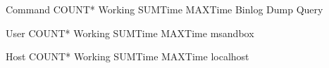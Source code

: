 \documentclass[letterpaper,10pt,english]{sphinxmanual}
\begin{document}
\begin{sphinxVerbatim}[commandchars=\\\{\}]

  Command                        COUNT* Working SUMTime MAXTime
  \PYGZhy{}\PYGZhy{}\PYGZhy{}\PYGZhy{}\PYGZhy{}\PYGZhy{}\PYGZhy{}\PYGZhy{}\PYGZhy{}\PYGZhy{}\PYGZhy{}\PYGZhy{}\PYGZhy{}\PYGZhy{}\PYGZhy{}\PYGZhy{}\PYGZhy{}\PYGZhy{}\PYGZhy{}\PYGZhy{}\PYGZhy{}\PYGZhy{}\PYGZhy{}\PYGZhy{}\PYGZhy{}\PYGZhy{}\PYGZhy{}\PYGZhy{}\PYGZhy{}\PYGZhy{} \PYGZhy{}\PYGZhy{}\PYGZhy{}\PYGZhy{}\PYGZhy{}\PYGZhy{}\PYGZhy{}\PYGZhy{} \PYGZhy{}\PYGZhy{}\PYGZhy{}\PYGZhy{}\PYGZhy{}\PYGZhy{}\PYGZhy{} \PYGZhy{}\PYGZhy{}\PYGZhy{}\PYGZhy{}\PYGZhy{}\PYGZhy{}\PYGZhy{}\PYGZhy{}\PYGZhy{} \PYGZhy{}\PYGZhy{}\PYGZhy{}\PYGZhy{}\PYGZhy{}\PYGZhy{}\PYGZhy{}\PYGZhy{}\PYGZhy{}
  Binlog Dump                                          
  Query                                                          

  User                           COUNT* Working SUMTime MAXTime
  \PYGZhy{}\PYGZhy{}\PYGZhy{}\PYGZhy{}\PYGZhy{}\PYGZhy{}\PYGZhy{}\PYGZhy{}\PYGZhy{}\PYGZhy{}\PYGZhy{}\PYGZhy{}\PYGZhy{}\PYGZhy{}\PYGZhy{}\PYGZhy{}\PYGZhy{}\PYGZhy{}\PYGZhy{}\PYGZhy{}\PYGZhy{}\PYGZhy{}\PYGZhy{}\PYGZhy{}\PYGZhy{}\PYGZhy{}\PYGZhy{}\PYGZhy{}\PYGZhy{}\PYGZhy{} \PYGZhy{}\PYGZhy{}\PYGZhy{}\PYGZhy{}\PYGZhy{}\PYGZhy{}\PYGZhy{}\PYGZhy{} \PYGZhy{}\PYGZhy{}\PYGZhy{}\PYGZhy{}\PYGZhy{}\PYGZhy{}\PYGZhy{} \PYGZhy{}\PYGZhy{}\PYGZhy{}\PYGZhy{}\PYGZhy{}\PYGZhy{}\PYGZhy{}\PYGZhy{}\PYGZhy{} \PYGZhy{}\PYGZhy{}\PYGZhy{}\PYGZhy{}\PYGZhy{}\PYGZhy{}\PYGZhy{}\PYGZhy{}\PYGZhy{}
  msandbox                                             

  Host                           COUNT* Working SUMTime MAXTime
  \PYGZhy{}\PYGZhy{}\PYGZhy{}\PYGZhy{}\PYGZhy{}\PYGZhy{}\PYGZhy{}\PYGZhy{}\PYGZhy{}\PYGZhy{}\PYGZhy{}\PYGZhy{}\PYGZhy{}\PYGZhy{}\PYGZhy{}\PYGZhy{}\PYGZhy{}\PYGZhy{}\PYGZhy{}\PYGZhy{}\PYGZhy{}\PYGZhy{}\PYGZhy{}\PYGZhy{}\PYGZhy{}\PYGZhy{}\PYGZhy{}\PYGZhy{}\PYGZhy{}\PYGZhy{} \PYGZhy{}\PYGZhy{}\PYGZhy{}\PYGZhy{}\PYGZhy{}\PYGZhy{}\PYGZhy{}\PYGZhy{} \PYGZhy{}\PYGZhy{}\PYGZhy{}\PYGZhy{}\PYGZhy{}\PYGZhy{}\PYGZhy{} \PYGZhy{}\PYGZhy{}\PYGZhy{}\PYGZhy{}\PYGZhy{}\PYGZhy{}\PYGZhy{}\PYGZhy{}\PYGZhy{} \PYGZhy{}\PYGZhy{}\PYGZhy{}\PYGZhy{}\PYGZhy{}\PYGZhy{}\PYGZhy{}\PYGZhy{}\PYGZhy{}
  localhost                                            


\end{sphinxVerbatim}
\end{document}
